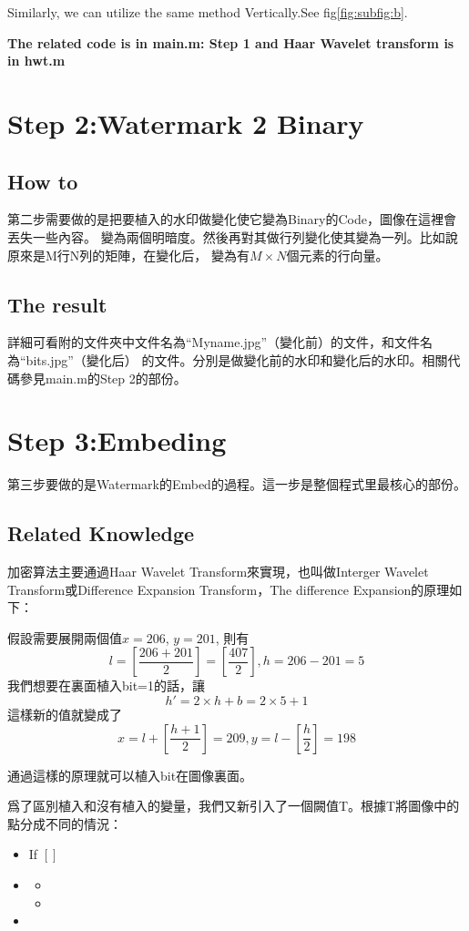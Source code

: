 \documentclass[a4paper,12pt]{article}%
\begin{document}
Similarly, we can utilize the same method Vertically.See fig\eqref{fig:subfig:b}.

\textbf{The related code is in main.m: Step 1 and Haar Wavelet transform is in hwt.m}

\section{Step 2:Watermark 2 Binary}
\subsection{How to}
    第二步需要做的是把要植入的水印做變化使它變為Binary的Code，圖像在這裡會丟失一些內容。
變為兩個明暗度。然後再對其做行列變化使其變為一列。比如說原來是M行N列的矩陣，在變化后，
變為有$M\times N$個元素的行向量。

\subsection{The result}
    詳細可看附的文件夾中文件名為“Myname.jpg”（變化前）的文件，和文件名為“bits.jpg”（變化后）
的文件。分別是做變化前的水印和變化后的水印。相關代碼參見main.m的Step 2的部份。

\section{Step 3:Embeding}
第三步要做的是Watermark的Embed的過程。這一步是整個程式里最核心的部份。

\subsection{Related Knowledge}
加密算法主要通過Haar Wavelet Transform來實現，也叫做Interger Wavelet Transform或Difference Expansion Transform，The difference Expansion的原理如下：

假設需要展開兩個值$x = 206$, $y = 201$, 則有
$$
l = [\frac{206+201}{2}]=[\frac{407}{2}],h = 206 - 201 = 5
$$
我們想要在裏面植入bit=1的話，讓
$$h' = 2 \times h + b = 2 \times 5 + 1$$
這樣新的值就變成了
$$x = l + [\frac{h+1}{2}] = 209, y = l - [\frac{h}{2}]=198$$

通過這樣的原理就可以植入bit在圖像裏面。

爲了區別植入和沒有植入的變量，我們又新引入了一個闕值T。根據T將圖像中的點分成不同的情況：

\begin{itemize}
  \item  If $[]$
  \item
  \begin{itemize}
    \item
    \item
  \end{itemize}
  \item
\end{itemize}
\end{document}
